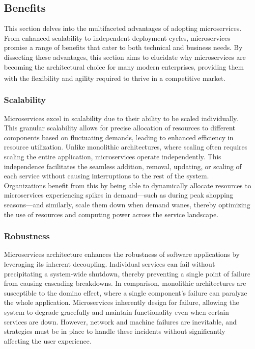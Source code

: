 \newpage

\subsection{Benefits}
This section delves into the multifaceted advantages of adopting microservices. From enhanced
scalability to independent deployment cycles, microservices promise a range of benefits that cater
to both technical and business needs. By dissecting these advantages, this section aims to elucidate
why microservices are becoming the architectural choice for many modern enterprises, providing them
with the flexibility and agility required to thrive in a competitive
market\textsuperscript{\cite{microservices_gitlab}}.

\subsubsection{Scalability}
Microservices excel in scalability due to their ability to be scaled individually. This granular
scalability allows for precise allocation of resources to different components based on fluctuating
demands, leading to enhanced efficiency in resource utilization. Unlike monolithic architectures,
where scaling often requires scaling the entire application, microservices operate independently.
This independence facilitates the seamless addition, removal, updating, or scaling of each service
without causing interruptions to the rest of the system. Organizations benefit from this by being
able to dynamically allocate resources to microservices experiencing spikes in demand—such as during
peak shopping seasons—and similarly, scale them down when demand wanes, thereby optimizing the use
of resources and computing power across the service landscape.

\subsubsection{Robustness}
Microservices architecture enhances the robustness of software applications by leveraging its
inherent decoupling. Individual services can fail without precipitating a system-wide shutdown,
thereby preventing a single point of failure from causing cascading breakdowns. In comparison,
monolithic architectures are susceptible to the domino effect, where a single component's failure
can paralyze the whole application. Microservices inherently design for failure, allowing the system
to degrade gracefully and maintain functionality even when certain services are down. However,
network and machine failures are inevitable, and strategies must be in place to handle these
incidents without significantly affecting the user experience.

